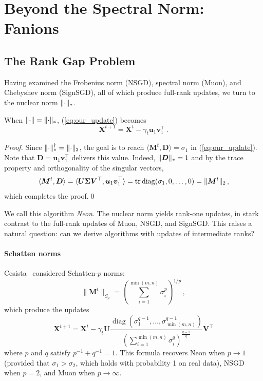 \documentclass[smallextended,referee,envcountsect]{svjour3}
\def\vu{{\bm{u}}}
\def\vv{{\bm{v}}}
\def\mD{{\bm{D}}}
\def\mM{{\bm{M}}}
\def\mU{{\bm{U}}}
\def\mV{{\bm{V}}}
\def\mX{{\bm{X}}}
\def\mSigma{{\bm{\Sigma}}}
\newcommand{\norm}[1]{\lVert #1\rVert}
\DeclarePairedDelimiter{\norms}{\|}{\|_{\mathrm{2}}}
\DeclarePairedDelimiter{\normn}{\|}{\|_{*}}
\def\<#1,#2>{\langle #1,#2\rangle}
\DeclareMathOperator{\tr}{tr}
\DeclareMathOperator{\diag}{diag}
\begin{document}
 \section{Beyond the Spectral Norm: Fanions}
 
 \subsection{The Rank Gap Problem}
 
 Having examined the Frobenius norm (NSGD), spectral norm (Muon), and Chebyshev norm (SignSGD), all of which produce full-rank updates, we turn to the nuclear norm $\normn{\cdot}$.
 
 \begin{lemma}\label{lemma:neon_update}
   When $\norm{\cdot} = \normn{\cdot}$, (\ref{eq:our_update}) becomes
   \begin{equation}\label{eq:neon_update}
     \mX^{t+1} = \mX^{t} - \gamma_t \vu_1 \vv_1^\top\,.
   \end{equation}
 \end{lemma}
 \begin{proof}
 Since $\normn{\cdot}^\dagger = \norms{\cdot}$, the goal is to reach $\<\mM^t, \mD> = \sigma_1$ in (\ref{eq:our_update}). Note that $\mD = \vu_1 \vv_1^\top$ delivers this value. Indeed, $\normn{\mD}=1$ and by the trace property and orthogonality of the singular vectors,
 \[
 \<\mM^t, \mD> =\<\mU \mSigma \mV^\top, \vu_1 \vv_1^\top> = \tr \diag({\sigma_1, 0, \dots, 0}) = \norms{\mM^t}\,,
 \]
 which completes the proof.\qed
\end{proof}
 
 We call this algorithm \emph{Neon}. The nuclear norm yields rank-one updates, in stark contrast to the full-rank updates of Muon, NSGD, and SignSGD. This raises a natural question: can we derive algorithms with updates of intermediate ranks?
 
 \paragraph{Schatten norms}
 Cesista~\cite{cesista2025schattenp} considered Schatten-$p$ norms:
 \[\norm{\mM^t}_{S_p} = \left(\sum_{i=1}^{\min(m, n)}\sigma_i^p\right)^{1/p}\,,
 \]
 which produce the updates
 \[
 \mX^{t+1} = \mX^t - \gamma_t \mU \frac{\diag\left(\sigma_1^{q-1}, \dots, \sigma_{\min(m,n)}^{q-1}\right)}{\left(\sum_{i=1}^{\min(m,n)}{\sigma_i^q}\right)^{\frac{q-1}{q}}}\mV^\top
 \]
 where $p$ and $q$ satisfy $p^{-1} + q^{-1} = 1$. This formula recovers Neon when $p\rightarrow1$ (provided that $\sigma_1 > \sigma_2$, which holds with probability 1 on real data), NSGD when $p=2$, and Muon when $p\rightarrow\infty$.
 
\end{document}

